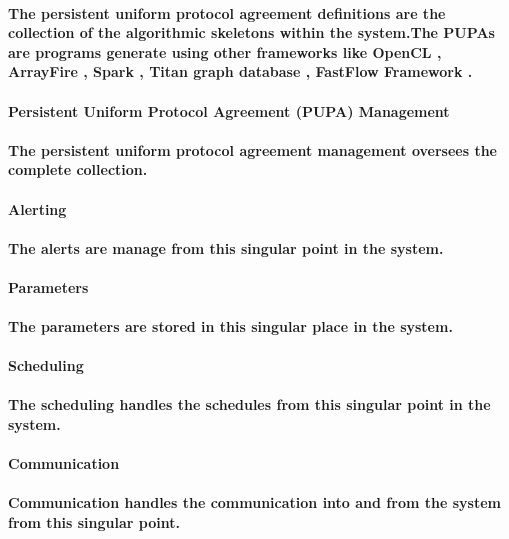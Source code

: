 \documentclass{acm_proc_article-sp}
\begin{document}
\paragraph{The persistent uniform protocol agreement definitions are the collection of the algorithmic skeletons within the system.The PUPAs are programs generate using other frameworks like OpenCL \cite{stone2010opencl}, ArrayFire \cite{malcolm2012arrayfire}, Spark \cite{hintjens2011omq}, Titan graph database \cite{tanase2014highly} \cite{mishra2014titan}, FastFlow Framework \cite{aldinucci2011accelerating}.}
\paragraph{\textbf{Persistent Uniform Protocol Agreement (PUPA) Management}}
\paragraph{The persistent uniform protocol agreement management oversees the complete collection.}
\paragraph{\textbf{Alerting}}
\paragraph{The alerts are manage from this singular point in the system.}
\paragraph{\textbf{Parameters}}
\paragraph{The parameters are stored in this singular place in the system.}
\paragraph{\textbf{Scheduling}}
\paragraph{The scheduling handles the schedules from this singular point in the system.}
\paragraph{\textbf{Communication}}
\paragraph{Communication handles the communication into and from the system from this singular point.}
\end{document}

